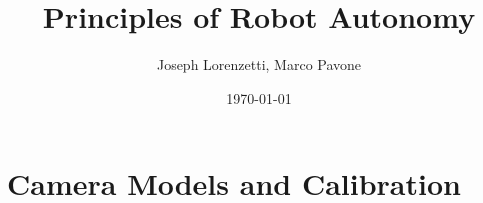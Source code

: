\documentclass[nohyper,nobib]{tufte-book}
\title{Principles of Robot Autonomy}
\author{Joseph Lorenzetti, Marco Pavone}
\date{\today}
\begin{document}
\chapter{Camera Models and Calibration}


\printbibliography
\end{document}
